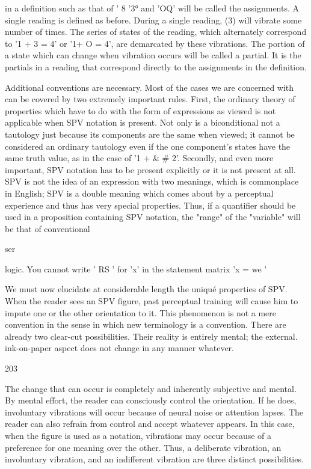 \documentclass[10pt,twoside]{memoir}
\begin{document}
\begin{enumerate}
{\begin{enumerate}
\begin{sysrules}
\begin{sysrules}
\begin{sysrules}
\begin{sysrules}
{\begin{enumerate}
{{{{{{{{{{in a definition such as that of ' 8 '3° and 'OQ' will be called the 
assignments. A single reading is defined as before. During a single reading, (3) 
will vibrate some number of times. The series of states of the reading, which 
alternately correspond to '1 + 3 = 4' or '1+ O = 4', are demarcated by 
these vibrations. The portion of a state which can change when vibration 
occurs will be called a partial. It is the partials in a reading that correspond 
directly to the assignments in the definition. 

Additional conventions are necessary. Most of the cases we are 
concerned with can be covered by two extremely important rules. First, the 
ordinary theory of properties which have to do with the form of expressions 
as viewed is not applicable when SPV notation is present. Not only is a 
biconditional not a tautology just because its components are the same when 
viewed; it cannot be considered an ordinary tautology even if the one 
component's states have the same truth value, as in the case of '1 + & # 
2'. Secondly, and even more important, SPV notation has to be present 
explicitly or it is not present at all. SPV is not the idea of an expression with 
two meanings, which is commonplace in English; SPV is a double meaning 
which comes about by a perceptual experience and thus has very special 
properties. Thus, if a quantifier should be used in a proposition containing 
SPV notation, the "range" of the "variable" will be that of conventional 


ser 


logic. You cannot write ' RS ' for 'x' in the statement matrix 'x 
= we ' 

We must now elucidate at considerable length the uniqué properties of 
SPV. When the reader sees an SPV figure, past perceptual training will cause 
him to impute one or the other orientation to it. This phenomenon is not a 
mere convention in the sense in which new terminology is a convention. 
There are already two clear-cut possibilities. Their reality is entirely mental; 
the external. ink-on-paper aspect does not change in any manner whatever. 


203 


The change that can occur is completely and inherently subjective and 
mental. By mental effort, the reader can consciously control the orientation. 
If he does, involuntary vibrations will occur because of neural noise or 
attention lapses. The reader can also refrain from control and accept 
whatever appears. In this case, when the figure is used as a notation, 
vibrations may occur because of a preference for one meaning over the 
other. Thus, a deliberate vibration, an involuntary vibration, and an 
indifferent vibration are three distinct possibilities. 

}}}}}}}}}}
\end{enumerate}}
\end{sysrules}
\end{sysrules}
\end{sysrules}
\end{sysrules}
\end{enumerate}}
\end{enumerate}
\end{document}
